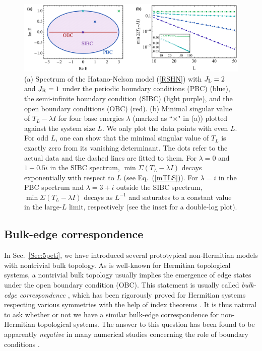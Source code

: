 \documentclass{tADP2e}
\theoremstyle{plain}
\theoremstyle{plain}
\theoremstyle{definition}
\begin{document}
\begin{figure}[!t]
\begin{center}
\includegraphics[width=12cm]{./Figures/fig_5_HN.pdf}
\end{center}
\caption{(a) Spectrum of the Hatano-Nelson model (\ref{RSHN}) with $J_{\rm L}=2$ and $J_{\rm R}=1$ under the periodic boundary conditions (PBC) (blue), the semi-infinite boundary condition (SIBC) (light purple), and the open boundary conditions (OBC) (red). (b) Minimal singular value of $T_L-\lambda I$ for four base energies $\lambda$ (marked as ``$\times$" in (a)) plotted against the system size $L$. We only plot the data points with even $L$. For odd $L$, one can show that the minimal singular value of $T_L$ is exactly zero from its vanishing determinant. The dots refer to the actual data and the dashed lines are fitted to them. For $\lambda=0$ and $1+0.5i$ in the SIBC spectrum, $\min\Sigma(T_L-\lambda I)$ decays exponentially with respect to $L$ (see Eq.~(\ref{mTLS})). For $\lambda=i$ in the PBC spectrum and $\lambda=3+i$ outside the SIBC spectrum, $\min\Sigma(T_L-\lambda I)$ decays as $L^{-1}$ and saturates to a constant value in the large-$L$ limit, respectively (see the inset for a double-log plot).} 
\label{fig:HN}
\end{figure}


\subsection{Bulk-edge correspondence}
\label{sec:bec}
In Sec.~\ref{Sec:5peti}, we have introduced several prototypical non-Hermitian models with nontrivial bulk topology. As is well-known for Hermitian topological systems, a nontrivial bulk topology usually implies the emergence of edge states under the open boundary condition (OBC). This statement is usually called \emph{bulk-edge correspondence} \cite{HY93}, which has been rigorously proved for Hermitian systems respecting various symmetries with the help of index theorems \cite{EP16}. It is thus natural to ask whether or not we have a similar bulk-edge correspondence for non-Hermitian topological systems. The answer to this question has been found to be apparently \emph{negative} in many numerical studies concerning the role of boundary conditions \cite{LTE16,YX18,YS18a}. 
\end{document}
